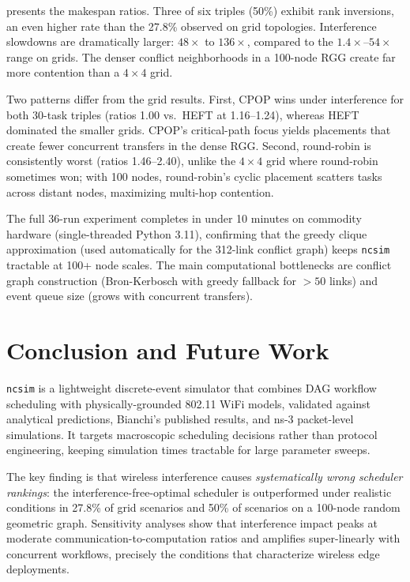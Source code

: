 \documentclass[conference]{IEEEtran}
\newcommand{\ncsim}{\texttt{ncsim}}
\begin{document}
 presents the makespan ratios.
Three of six triples (50\%) exhibit rank inversions, an even higher
rate than the 27.8\% observed on grid topologies.  Interference
slowdowns are dramatically larger: $48\times$ to $136\times$, compared
to the $1.4\times$--$54\times$ range on grids.  The denser conflict
neighborhoods in a 100-node RGG create far more contention than a
$4\times4$ grid.

Two patterns differ from the grid results.  First, CPOP wins under
interference for both 30-task triples (ratios 1.00 vs.\ HEFT at
1.16--1.24), whereas HEFT dominated the smaller grids.  CPOP's
critical-path focus yields placements that create fewer concurrent
transfers in the dense RGG.  Second, round-robin is consistently
worst (ratios 1.46--2.40), unlike the $4\times4$ grid where round-robin
sometimes won; with 100 nodes, round-robin's cyclic placement
scatters tasks across distant nodes, maximizing multi-hop contention.

The full 36-run experiment completes in under 10 minutes on commodity
hardware (single-threaded Python 3.11), confirming that the greedy
clique approximation (used automatically for the 312-link conflict
graph) keeps \ncsim{} tractable at 100+ node scales.  The main
computational bottlenecks are conflict graph construction (Bron-Kerbosch
with greedy fallback for $>50$ links) and event queue size (grows with
concurrent transfers).


\section{Conclusion and Future Work}
\label{sec:conclusion}

\ncsim{} is a lightweight discrete-event simulator that combines DAG
workflow scheduling with physically-grounded 802.11 WiFi models,
validated against analytical predictions, Bianchi's published results,
and ns-3 packet-level simulations.  It targets macroscopic scheduling
decisions rather than protocol engineering, keeping simulation times
tractable for large parameter sweeps.

The key finding is that wireless interference causes \emph{systematically
wrong scheduler rankings}: the interference-free-optimal scheduler is
outperformed under realistic conditions in 27.8\% of grid scenarios and
50\% of scenarios on a 100-node random geometric graph.  Sensitivity
analyses show that interference impact peaks at moderate
communication-to-computation ratios and amplifies super-linearly with
concurrent workflows, precisely the conditions that characterize
wireless edge deployments.
\end{document}
